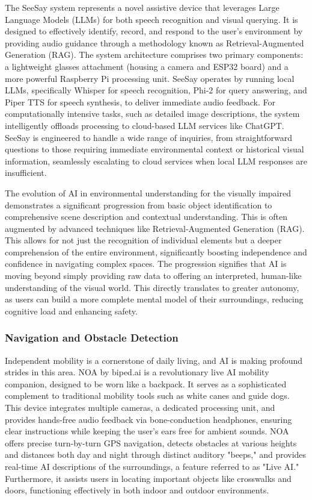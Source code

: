The SeeSay system represents a novel assistive device that leverages Large Language Models (LLMs) for both speech recognition and visual querying. It is designed to effectively identify, record, and respond to the user's environment by providing audio guidance through a methodology known as Retrieval-Augmented Generation (RAG). The system architecture comprises two primary components: a lightweight glasses attachment (housing a camera and ESP32 board) and a more powerful Raspberry Pi processing unit. SeeSay operates by running local LLMs, specifically Whisper for speech recognition, Phi-2 for query answering, and Piper TTS for speech synthesis, to deliver immediate audio feedback. For computationally intensive tasks, such as detailed image descriptions, the system intelligently offloads processing to cloud-based LLM services like ChatGPT. SeeSay is engineered to handle a wide range of inquiries, from straightforward questions to those requiring immediate environmental context or historical visual information, seamlessly escalating to cloud services when local LLM responses are insufficient. \cite{moonlight2024, seesay2024, arxiv2410}

The evolution of AI in environmental understanding for the visually impaired demonstrates a significant progression from basic object identification to comprehensive scene description and contextual understanding. This is often augmented by advanced techniques like Retrieval-Augmented Generation (RAG). This allows for not just the recognition of individual elements but a deeper comprehension of the entire environment, significantly boosting independence and confidence in navigating complex spaces. The progression signifies that AI is moving beyond simply providing raw data to offering an interpreted, human-like understanding of the visual world. This directly translates to greater autonomy, as users can build a more complete mental model of their surroundings, reducing cognitive load and enhancing safety.

\subsubsection{Navigation and Obstacle Detection}
\label{subsubsec:navigation-obstacle-detection}

Independent mobility is a cornerstone of daily living, and AI is making profound strides in this area. NOA by biped.ai is a revolutionary live AI mobility companion, designed to be worn like a backpack. It serves as a sophisticated complement to traditional mobility tools such as white canes and guide dogs. This device integrates multiple cameras, a dedicated processing unit, and provides hands-free audio feedback via bone-conduction headphones, ensuring clear instructions while keeping the user's ears free for ambient sounds. NOA offers precise turn-by-turn GPS navigation, detects obstacles at various heights and distances both day and night through distinct auditory "beeps," and provides real-time AI descriptions of the surroundings, a feature referred to as "Live AI." Furthermore, it assists users in locating important objects like crosswalks and doors, functioning effectively in both indoor and outdoor environments. \cite{bipedai}

